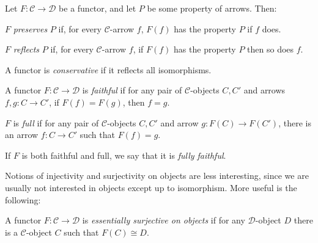 \documentclass[article, a4paper, 11pt, oneside]{memoir}
\numberwithin{equation}{chapter}
\newcommand{\cat}[1]{\mathcal{#1}}
\newcommand{\catC}{\cat{C}}
\newcommand{\catD}{\cat{D}}
\begin{document}
\begin{definition}
    Let $F \colon \catC \to \catD$ be a functor, and let $P$ be some property of arrows. Then:
    \begin{enumdef}
        \item $F$ \emph{preserves} $P$ if, for every $\catC$-arrow $f$, $F(f)$ has the property $P$ if $f$ does.

        \item $F$ \emph{reflects} $P$ if, for every $\catC$-arrow $f$, if $F(f)$ has the property $P$ then so does $f$.
    \end{enumdef}
    A functor is \emph{conservative} if it reflects all isomorphisms.
\end{definition}




\begin{definition}
    A functor $F \colon \catC \to \catD$ is \emph{faithful} if for any pair of $\catC$-objects $C, C'$ and arrows $f,g \colon C \to C'$, if $F(f) = F(g)$, then $f = g$.

    $F$ is \emph{full} if for any pair of $\catC$-objects $C,C'$ and arrow $g \colon F(C) \to F(C')$, there is an arrow $f \colon C \to C'$ such that $F(f) = g$.

    If $F$ is both faithful and full, we say that it is \emph{fully faithful}.
\end{definition}
%
Notions of injectivity and surjectivity on objects are less interesting, since we are usually not interested in objects except up to isomorphism. More useful is the following:

\begin{definition}
    A functor $F \colon \catC \to \catD$ is \emph{essentially surjective on objects} if for any $\catD$-object $D$ there is a $\catC$-object $C$ such that $F(C) \cong D$.
\end{definition}
\end{document}
